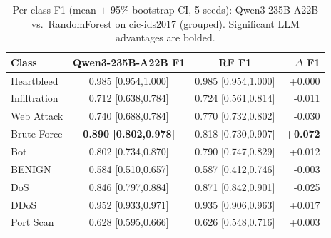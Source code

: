 \begin{table}[t]
\caption{Per-class F1 (mean $\pm$ 95\% bootstrap CI, 5 seeds): Qwen3-235B-A22B vs.\ RandomForest on cic-ids2017 (grouped). Significant LLM advantages are bolded.}
\label{t:r2_perclass}
\begin{tabular}{lccr}
\hline
Class & Qwen3-235B-A22B F1 & RF F1 & $\Delta$ F1 \\
\hline
Heartbleed & 0.985 [0.954,1.000] & 0.985 [0.954,1.000] & +0.000 \\
Infiltration & 0.712 [0.638,0.784] & 0.724 [0.561,0.814] & -0.011 \\
Web Attack & 0.740 [0.688,0.784] & 0.770 [0.732,0.802] & -0.030 \\
Brute Force & \textbf{0.890 [0.802,0.978]} & 0.818 [0.730,0.907] & \textbf{+0.072} \\
Bot & 0.802 [0.734,0.870] & 0.790 [0.747,0.829] & +0.012 \\
BENIGN & 0.584 [0.510,0.657] & 0.587 [0.412,0.746] & -0.003 \\
DoS & 0.846 [0.797,0.884] & 0.871 [0.842,0.901] & -0.025 \\
DDoS & 0.952 [0.933,0.971] & 0.935 [0.906,0.963] & +0.017 \\
Port Scan & 0.628 [0.595,0.666] & 0.626 [0.548,0.716] & +0.003 \\
\hline
\end{tabular}
\end{table}